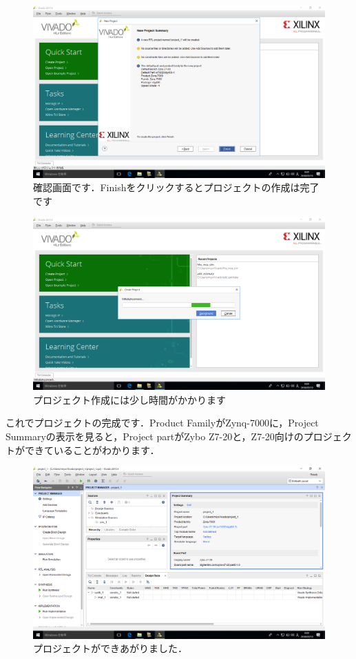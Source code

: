 \documentclass[a4paper,dvipdfmx]{jsarticle}
\begin{document}
 \begin{figure}[H]
  \begin{center}
   \includegraphics[width=.8\textwidth]{chapter03_figures/VirtualBox_Windows10_19_03_2018_00_02_55.png}
  \end{center}
  \caption{確認画面です．Finishをクリックするとプロジェクトの作成は完了です}
 \end{figure}

 \begin{figure}[H]
  \begin{center}
   \includegraphics[width=.8\textwidth]{chapter03_figures/VirtualBox_Windows10_19_03_2018_00_03_06.png}
  \end{center}
  \caption{プロジェクト作成には少し時間がかかります}
 \end{figure}

これでプロジェクトの完成です．Product FamilyがZynq-7000に，Project Summaryの表示を見ると，Project partがZybo Z7-20と，Z7-20向けのプロジェクトができていることがわかります．
 \begin{figure}[H]
  \begin{center}
   \includegraphics[width=.8\textwidth]{chapter03_figures/VirtualBox_Windows10_19_03_2018_00_03_17.png}
  \end{center}
  \caption{プロジェクトができあがりました．}
 \end{figure}
\end{document}

